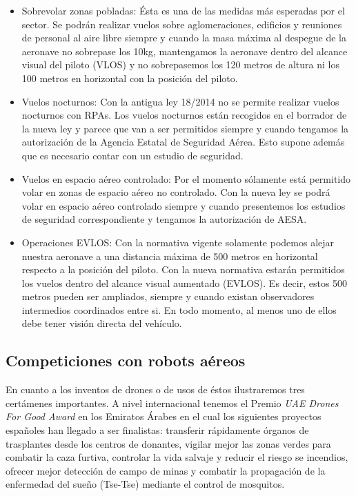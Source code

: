 	\begin{itemize}
		\item Sobrevolar zonas pobladas: Ésta es una de las medidas más esperadas por el sector. Se podrán realizar vuelos sobre aglomeraciones, edificios y reuniones de personal al aire libre siempre y cuando la masa máxima al despegue de la aeronave no sobrepase los 10kg, mantengamos la aeronave dentro del alcance visual del piloto (VLOS) y no sobrepasemos los 120 metros de altura ni los 100 metros en horizontal con la posición del piloto.
		\item Vuelos nocturnos: Con la antigua ley 18/2014 no se permite realizar vuelos nocturnos con RPAs. Los vuelos nocturnos están recogidos en el borrador de la nueva ley y parece que van a ser permitidos siempre y cuando tengamos la autorización de la Agencia Estatal de Seguridad Aérea. Esto supone además que es necesario contar con un estudio de seguridad.
		\item Vuelos en espacio aéreo controlado: Por el momento sólamente está permitido volar en zonas de espacio aéreo no controlado. Con la nueva ley se podrá volar en espacio aéreo controlado siempre y cuando presentemos los estudios de seguridad correspondiente y tengamos la autorización de AESA.
		\item Operaciones EVLOS: Con la normativa vigente solamente podemos alejar nuestra aeronave a una distancia máxima de 500 metros en horizontal respecto a la posición del piloto. Con la nueva normativa estarán permitidos los vuelos dentro del alcance visual aumentado (EVLOS). Es decir, estos 500 metros pueden ser ampliados, siempre y cuando existan observadores intermedios coordinados entre si. En todo momento, al menos uno de ellos debe tener visión directa del vehículo.
	\end{itemize}	 

\subsection{Competiciones con robots aéreos}
\hspace{1cm} En cuanto a los inventos de drones o de usos de éstos ilustraremos tres certámenes importantes. A nivel internacional tenemos el Premio \textit{UAE Drones For Good Award} en los Emiratos Árabes en el cual los siguientes proyectos españoles han llegado a ser finalistas: transferir rápidamente órganos de trasplantes desde los centros de donantes, vigilar mejor las zonas verdes para combatir la caza furtiva, controlar la vida salvaje y reducir el riesgo se incendios, ofrecer mejor detección de campo de minas y combatir la propagación de la enfermedad del sueño (Tse-Tse) mediante el control de mosquitos.
\\

